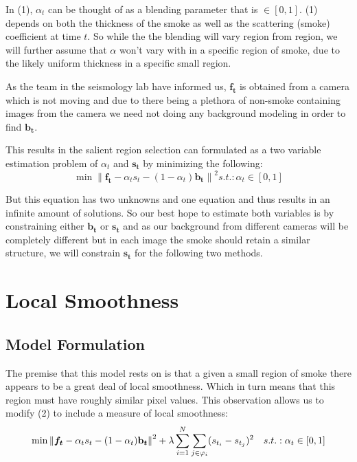 \documentclass[12pt]{article}
\begin{document}
In (1), $\alpha_{t}$ can be thought of as a blending parameter that is $\in \left [0,1\right ]$. (1) depends on both the thickness of the smoke as well as the scattering (smoke) coefficient at time $t$. So while the the blending will vary region from region, we will further assume that $\alpha$ won't vary with in a specific region of smoke, due to the likely uniform thickness in a specific small region.  

As the team in the seismology lab have informed us, $\boldsymbol{f_{t}}$ is obtained from a camera which is not moving and due to there being a plethora of non-smoke containing images from the camera we need not doing any background modeling in order to find $\boldsymbol{b_{t}}$.  

This results in the salient region selection can formulated as a two variable estimation problem of $\alpha_{t}$ and $\boldsymbol{s_{t}}$ by minimizing the following: 
\begin{equation}
\min\left \|   \boldsymbol{f_{t}} - \alpha_{t} s_{t} - (1-\alpha_{t} )\boldsymbol{\mathbf{b}_{t}}\right \|^2  s.t. :   \alpha_{t} \in \left [ 0 ,1 \right ]
\end{equation}

But this equation has two unknowns and one equation and thus results in an infinite amount of solutions. So our best hope to estimate both variables is by constraining either $\boldsymbol{b_t}$ or $\boldsymbol{s_{t}}$ and as our background from different cameras will be completely different but in each image the smoke should retain a similar structure, we will constrain $\boldsymbol{s_{t}}$ for the following two methods.   


\section{Local Smoothness}
\label{sect:basics}

\subsection{Model Formulation}
The premise that this model rests on is that a given a small region of smoke there appears to be a great deal of local smoothness. Which in turn means that this region must have roughly similar pixel values. This observation allows us to modify (2) to include a measure of local smoothness: 
\begin{equation}
\min\left \|   \boldsymbol{f_{t}} - \alpha_{t} s_{t} - (1-\alpha_{t} )\boldsymbol{\mathbf{b}_{t}}\right \|^2 +\lambda\sum_{i = 1}^{N} \sum_{j\in\varphi_{i}}(s_{t_i}-s_{t_j})^2 \\ 
\quad
 s.t. :   \alpha_{t} \in \left [ 0 ,1 \right ]
\end{equation}
\end{document}
